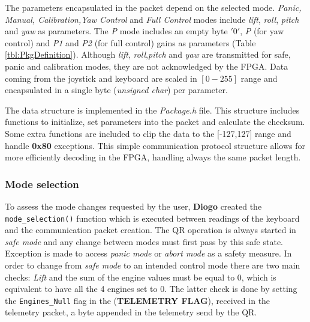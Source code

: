 \documentclass{article}
\begin{document}
The parameters encapsulated in the packet depend on the selected mode. \emph{Panic, Manual, Calibration,Yaw Control} and \emph{Full Control} modes include \emph{lift}, \emph{roll}, \emph{pitch} and \emph{yaw} as parameters. The \emph{P} mode includes an empty byte $'0'$, \emph{P} (for yaw control) and \emph{P1} and \emph{P2} (for full control) gains as parameters (Table \ref{tbl:PkgDefinition}). Although \emph{lift}, \emph{roll},\emph{pitch} and \emph{yaw} are transmitted for safe, panic and calibration modes, they are not acknowledged by the FPGA. Data coming from the joystick and keyboard are scaled in $[0-255]$ range and encapsulated in a single byte (\emph{unsigned char}) per parameter.

The data structure is implemented in the \emph{Package.h} file. This structure includes functions to initialize, set parameters into the packet and calculate the checksum. Some extra functions are included to clip the data to the [-127,127] range and handle \textbf{0x80} exceptions. This simple communication protocol structure allows for more efficiently decoding in the FPGA, handling always the same packet length.


\subsubsection{Mode selection}
\label{sec:modeselection}
To assess the mode changes requested by the user, \textbf{Diogo} created the \texttt{mode\_selection()} function which is executed between readings of the keyboard and the communication packet creation. The QR operation is always started in \textit{safe mode} and any change between modes must first pass by this safe state. Exception is made to access \textit{panic mode} or \textit{abort mode} as a safety measure. In order to change from \textit{safe mode} to an intended control mode there are two main checks: \textit{Lift} and the sum of the engine values must be equal to $0$, which is equivalent to have all the 4 engines set to $0$. The latter check is done by setting the \texttt{Engines\_Null} flag in the (\textbf{TELEMETRY FLAG}), received in the telemetry packet, a byte appended in the telemetry send by the QR. 
\end{document}
